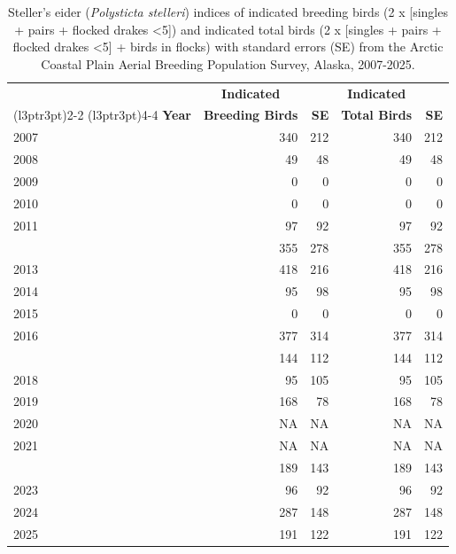 \documentclass[
]{article}
\begin{document}
\begin{longtable}[t]{lrrrr}

\caption{\label{tbl-STEI}Steller's eider (\emph{Polysticta stelleri})
indices of indicated breeding birds (2 x {[}singles + pairs + flocked
drakes \textless5{]}) and indicated total birds (2 x {[}singles + pairs
+ flocked drakes \textless5{]} + birds in flocks) with standard errors
(SE) from the Arctic Coastal Plain Aerial Breeding Population Survey,
Alaska, 2007-2025.}

\tabularnewline

\\
\toprule
\multicolumn{1}{c}{\textbf{ }} & \multicolumn{1}{c}{\textbf{Indicated}} & \multicolumn{1}{c}{\textbf{ }} & \multicolumn{1}{c}{\textbf{Indicated}} & \multicolumn{1}{c}{\textbf{ }} \\
\cmidrule(l{3pt}r{3pt}){2-2} \cmidrule(l{3pt}r{3pt}){4-4}
\textbf{Year} & \textbf{Breeding Birds} & \textbf{SE} & \textbf{Total Birds} & \textbf{SE}\\
\midrule
2007 & 340 & 212 & 340 & 212\\
2008 & 49 & 48 & 49 & 48\\
2009 & 0 & 0 & 0 & 0\\
2010 & 0 & 0 & 0 & 0\\
2011 & 97 & 92 & 97 & 92\\
\addlinespace
2012 & 355 & 278 & 355 & 278\\
2013 & 418 & 216 & 418 & 216\\
2014 & 95 & 98 & 95 & 98\\
2015 & 0 & 0 & 0 & 0\\
2016 & 377 & 314 & 377 & 314\\
\addlinespace
2017 & 144 & 112 & 144 & 112\\
2018 & 95 & 105 & 95 & 105\\
2019 & 168 & 78 & 168 & 78\\
2020 & NA & NA & NA & NA\\
2021 & NA & NA & NA & NA\\
\addlinespace
2022 & 189 & 143 & 189 & 143\\
2023 & 96 & 92 & 96 & 92\\
2024 & 287 & 148 & 287 & 148\\
2025 & 191 & 122 & 191 & 122\\
\bottomrule

\end{longtable}

\endgroup{}

\newpage{}
\end{document}

